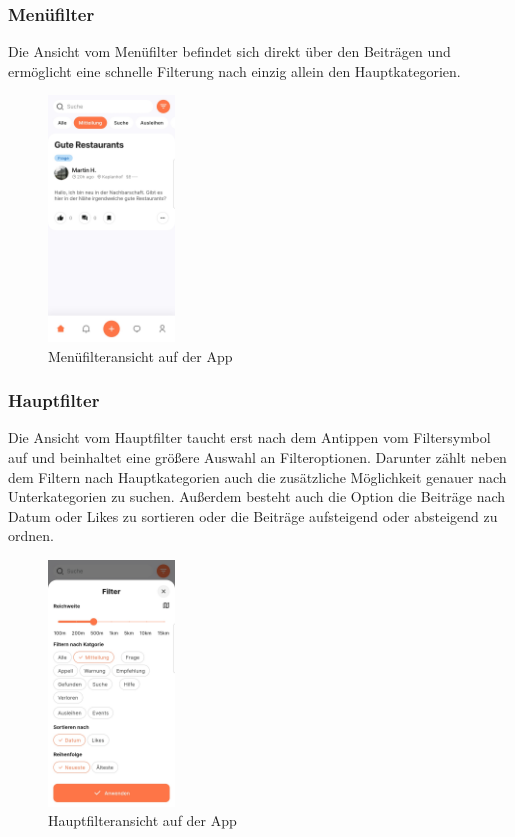 \subsubsection{Menüfilter}

Die Ansicht vom Menüfilter befindet sich direkt über den Beiträgen und ermöglicht eine schnelle Filterung nach einzig allein den Hauptkategorien.

\begin{figure}[h]
  \centering
  \includegraphics[width=0.3\textwidth]{pics/menu-filter.jpg}
  \caption{Menüfilteransicht auf der App}
\end{figure}

\subsubsection{Hauptfilter}

Die Ansicht vom Hauptfilter taucht erst nach dem Antippen vom Filtersymbol auf und beinhaltet eine größere Auswahl an Filteroptionen. Darunter zählt neben dem Filtern nach Hauptkategorien auch die zusätzliche Möglichkeit genauer nach Unterkategorien zu suchen. Außerdem besteht auch die Option die Beiträge nach Datum oder Likes zu sortieren oder die Beiträge aufsteigend oder absteigend zu ordnen.

\begin{figure}[h]
  \centering
  \includegraphics[width=0.3\textwidth]{pics/main-filter.jpg}
  \caption{Hauptfilteransicht auf der App}
\end{figure}

